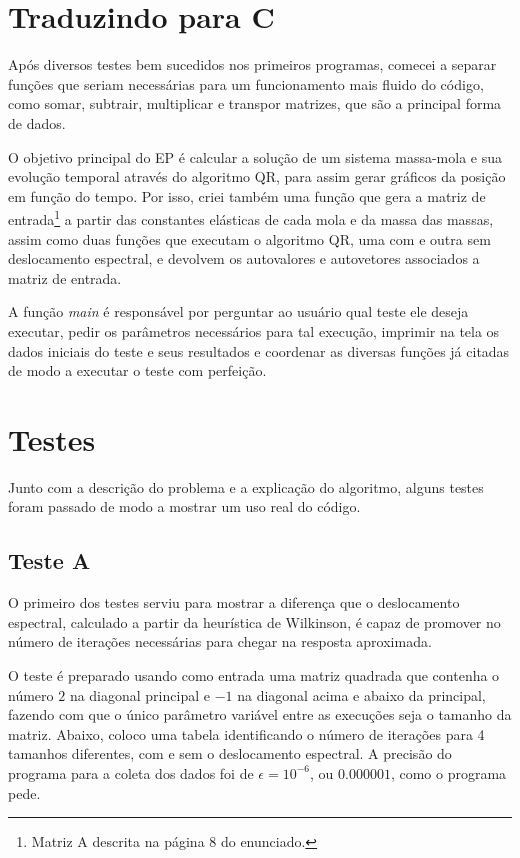 \documentclass[12pt]{article} %
\begin{document}
\section{Traduzindo para C}
    
    Após diversos testes bem sucedidos nos primeiros programas, comecei a separar funções que seriam necessárias para um funcionamento mais fluido do código, como somar, subtrair, multiplicar e transpor matrizes, que são a principal forma de dados. 
    
    O objetivo principal do EP é calcular a solução de um sistema massa-mola e sua evolução temporal através do algoritmo QR, para assim gerar gráficos da posição em função do tempo. Por isso, criei também uma função que gera a matriz de entrada\footnote{Matriz A descrita na página 8 do enunciado.} a partir das constantes elásticas de cada mola e da massa das massas, assim como duas funções que executam o algoritmo QR, uma com e outra sem deslocamento espectral, e devolvem os autovalores e autovetores associados a matriz de entrada. 
    
    A função \textit{main} é responsável por perguntar ao usuário qual teste ele deseja executar, pedir os parâmetros necessários para tal execução, imprimir na tela os dados iniciais do teste e seus resultados e coordenar as diversas funções já citadas de modo a executar o teste com perfeição.
    
\section{Testes}

    Junto com a descrição do problema e a explicação do algoritmo, alguns testes foram passado de modo a mostrar um uso real do código. 

    \subsection{Teste A}
    
        O primeiro dos testes serviu para mostrar a diferença que o deslocamento espectral, calculado a partir da heurística de Wilkinson, é capaz de promover no número de iterações necessárias para chegar na resposta aproximada.
        
        O teste é preparado usando como entrada uma matriz quadrada que contenha o número $2$ na diagonal principal e $-1$ na diagonal acima e abaixo da principal, fazendo com que o único parâmetro variável entre as execuções seja o tamanho da matriz. Abaixo, coloco uma tabela identificando o número de iterações para 4 tamanhos diferentes, com e sem o deslocamento espectral. A precisão do programa para a coleta dos dados foi de $\epsilon = 10^{-6}$, ou $0.000001$, como o programa pede. 
        
\end{document}
